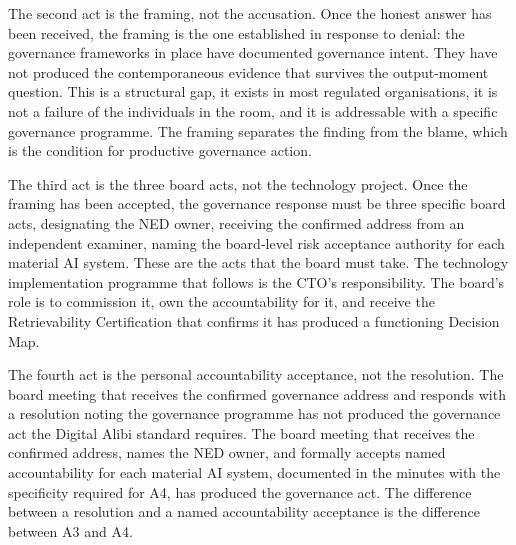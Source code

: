 The second act is the framing, not the accusation. Once the honest answer has been received, the framing is the one established in response to denial: the governance frameworks in place have documented governance intent. They have not produced the contemporaneous evidence that survives the output-moment question. This is a structural gap, it exists in most regulated organisations, it is not a failure of the individuals in the room, and it is addressable with a specific governance programme. The framing separates the finding from the blame, which is the condition for productive governance action.

The third act is the three board acts, not the technology project. Once the framing has been accepted, the governance response must be three specific board acts, designating the NED owner, receiving the confirmed address from an independent examiner, naming the board-level risk acceptance authority for each material AI system. These are the acts that the board must take. The technology implementation programme that follows is the CTO's responsibility. The board's role is to commission it, own the accountability for it, and receive the Retrievability Certification that confirms it has produced a functioning Decision Map.

The fourth act is the personal accountability acceptance, not the resolution. The board meeting that receives the confirmed governance address and responds with a resolution noting the governance programme has not produced the governance act the Digital Alibi standard requires. The board meeting that receives the confirmed address, names the NED owner, and formally accepts named accountability for each material AI system, documented in the minutes with the specificity required for A4, has produced the governance act. The difference between a resolution and a named accountability acceptance is the difference between A3 and A4.

